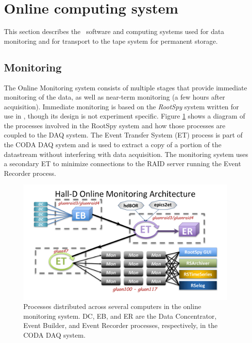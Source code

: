 
\section[Online computing system]{Online computing system \label{sec:online}}

This section describes the \GX ~software and computing systems  used for data monitoring and for transport to the tape system for permanent storage.

\subsection{Monitoring \label{sec:onlinemonitoring}}

The Online Monitoring system consists of multiple stages that provide immediate monitoring of the data, as well as near-term monitoring (a few hours after acquisition). Immediate monitoring is based on the \textit{RootSpy} system\cite{rootspy} written for use in \GX, though its design is not experiment specific. Figure \ref{fig:online_monitoring_processes} shows a diagram of the processes involved in the RootSpy system and how those processes are coupled to the DAQ system. The Event Transfer System (ET) process is part of the CODA DAQ system \cite{coda} and is used to extract a copy of a portion of the datastream without interfering with data acquisition. The monitoring system uses a secondary ET to minimize connections to the RAID server running the Event Recorder process.

\begin{figure}[tbp]
\begin{center}
\includegraphics[width=0.99\textwidth, clip,trim=1.5cm 0.9cm 1.7cm 0.8cm]{figures/online_monitoring_processes.pdf}
\caption{\label{fig:online_monitoring_processes}Processes distributed across several computers in the online monitoring system. DC, EB, and ER are the Data Concentrator, Event Builder, and Event Recorder processes, respectively, in the CODA DAQ system.}   
\end{center}  
\end{figure}

